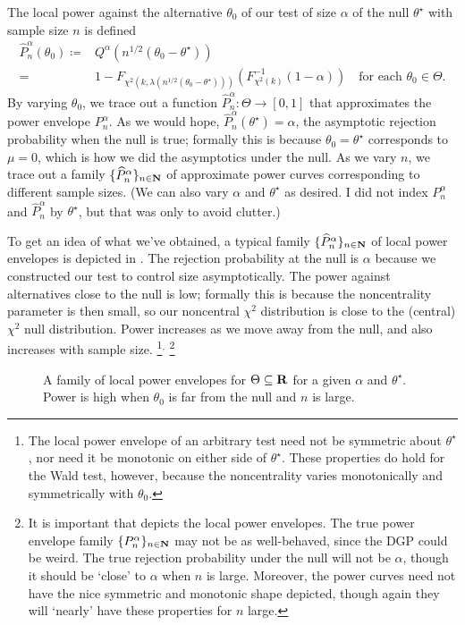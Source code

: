 \documentclass[11pt,letterpaper,reqno,oneside]{article}
\begin{document}
The local power against the alternative $\theta_0$ of our test of size $\alpha$ of the null $\theta^\star$ with sample size $n$ is defined
%
\begin{align*}
	\widehat{P}_n^\alpha(\theta_0) 
	\coloneqq{}&
	Q^\alpha\left( n^{1/2} \left( \theta_0 - \theta^\star \right) \right)
	\\
	={}& 1 - F_{ \chi^2\left( k, 
	\lambda \left( n^{1/2} \left( \theta_0 - \theta^\star \right) \right) \right) }
	\left( F_{\chi^2(k)}^{-1}(1-\alpha) \right)
	\quad\text{for each $\theta_0 \in \Theta$} .
\end{align*}
%
By varying $\theta_0$, we trace out a function $\widehat{P}_n^\alpha : \Theta \to [0,1]$ that approximates the power envelope $P_n^\alpha$. As we would hope, $\widehat{P}_n^\alpha(\theta^\star)=\alpha$, the asymptotic rejection probability when the null is true; formally this is because $\theta_0=\theta^\star$ corresponds to $\mu=0$, which is how we did the asymptotics under the null. As we vary $n$, we trace out a family $\{ \widehat{P}_n^\alpha \}_{n \in \mathbf{N}}$ of approximate power curves corresponding to different sample sizes. (We can also vary $\alpha$ and $\theta^\star$ as desired. I did not index $P^\alpha_n$ and $\widehat{P}_n^\alpha$ by $\theta^\star$, but that was only to avoid clutter.)

To get an idea of what we've obtained, a typical family $\{ \widehat{P}_n^\alpha \}_{n \in \mathbf{N}}$ of local power envelopes is depicted in . The rejection probability at the null is $\alpha$ because we constructed our test to control size asymptotically. The power against alternatives close to the null is low; formally this is because the noncentrality parameter is then small, so our noncentral $\chi^2$ distribution is close to the (central) $\chi^2$ null distribution. Power increases as we move away from the null, and also increases with sample size.%
	\footnote{The local power envelope of an arbitrary test need not be symmetric about $\theta^\star$, nor need it be monotonic on either side of $\theta^\star$. These properties do hold for the Wald test, however, because the noncentrality varies monotonically and symmetrically with $\theta_0$.}$^,$%
	\footnote{It is important that  depicts the local power envelopes. The true power envelope family $\{ P^\alpha_n \}_{n \in \mathbf{N}}$ may not be as well-behaved, since the DGP could be weird. The true rejection probability under the null will not be $\alpha$, though it should be `close' to $\alpha$ when $n$ is large. Moreover, the power curves need not have the nice symmetric and monotonic shape depicted, though again they will `nearly' have these properties for $n$ large.}
%
\begin{figure}
	\centering
	
	\caption{A family of local power envelopes for $\Theta \subseteq \mathbf{R}$ for a given $\alpha$ and $\theta^\star$. Power is high when $\theta_0$ is far from the null and $n$ is large.}
	\label{fig:power}
\end{figure}
\end{document}
